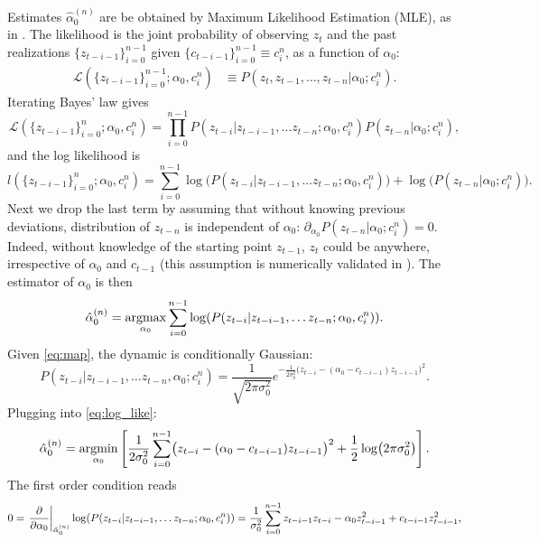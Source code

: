 \documentclass[FinalReport.tex]{subfiles}
\begin{document}
Estimates $\hat{\alpha}_0^{(n)}$ are be obtained by Maximum Likelihood Estimation (MLE), as in \cite{OptCont}. The likelihood is the joint probability of observing $z_t$ and the past realizations $\{z_{t-i-1}\}_{i=0}^{n-1}$ given $\{c_{t-i-1}\}_{i=0}^{n-1}\equiv c_i^n$, as a function of $\alpha_0$:
\begin{align}
	\mathcal{L}(\{z_{t-i-1}\}_{i=0}^{n-1};\alpha_0,c_i^n)&\equiv P(z_t,z_{t-1},\dots,z_{t-n}\vert \alpha_0;c_i^n)\label{eq:mle}.
\end{align}
Iterating Bayes' law gives
\begin{equation}
	\mathcal{L}(\{z_{t-i-1}\}_{i=0}^{n};\alpha_0,c_i^n)=\prod_{i=0}^{n-1}P(z_{t-i}\vert z_{t-i-1},\dots z_{t-n};\alpha_0,c_i^n) P(z_{t-n}\vert \alpha_0;c_i^n),
\end{equation}
and the log likelihood is
\begin{equation}\label{eq:log_lik_full}
	l(\{z_{t-i-1}\}_{i=0}^{n};\alpha_0,c_i^n)=\sum_{i=0}^{n-1}\log\bigl(P(z_{t-i}\vert z_{t-i-1},\dots z_{t-n};\alpha_0,c_i^n)\bigr) + \log\bigl(P(z_{t-n}\vert \alpha_0;c_i^n)\bigr).
\end{equation}
Next we drop the last term by assuming that without knowing previous deviations, distribution of $z_{t-n}$ is independent of $\alpha_0$: $\partial_{\alpha_0}{P(z_{t-n}\vert \alpha_0;c_i^n)}=0$. Indeed, without knowledge of the starting point $z_{t-1}$, $z_t$ could be anywhere, irrespective of $\alpha_0$ and $c_{t-1}$ (this assumption is numerically validated in \cite{OptCont}). The estimator of $\alpha_0$ is then
\begin{equation}\label{eq:log_like}
	\hat{\alpha}_0^{(n)}=\operatorname*{argmax}_{\alpha_0}\sum_{i=0}^{n-1}\log(P(z_{t-i}\vert z_{t-i-1},\dots z_{t-n};\alpha_0,c_i^n)).
\end{equation}
Given \eqref{eq:map}, the dynamic is conditionally Gaussian:
\begin{equation}
	P(z_{t-i}\vert z_{t-i-1},\dots z_{t-n},\alpha_0;c_i^n)=\frac{1}{\sqrt{2\pi\sigma_0^2}}e^{-\frac{1}{2\sigma_0^2}\bigl(z_{t-i}-(\alpha_0-c_{t-i-1})z_{t-i-1}\bigr)^2}.
\end{equation}
Plugging into \eqref{eq:log_like}:
\begin{equation}
\hat{\alpha}_0^{(n)}=\operatorname*{argmin}_{\alpha_0}\left[\frac{1}{2\sigma_0^2}\sum_{i=0}^{n-1}\bigl(z_{t-i}-(\alpha_0-c_{t-i-1})z_{t-i-1}\bigr)^2 +\frac{1}{2}\log(2\pi\sigma_0^2)\right].
\end{equation}
The first order condition reads
\begin{equation}
0=\left.\pdv{}{\alpha_0}\right\vert_{\hat{\alpha}_0^{(n)}}\log(P(z_{t-i}\vert z_{t-i-1},\dots z_{t-n};\alpha_0,c_i^n))=\frac{1}{\sigma_0^2} \sum_{i=0}^{n-1} z_{t-i-1}z_{t-i}-\alpha_0z_{t-i-1}^2+c_{t-i-1}z_{t-i-1}^2,
\end{equation}
\end{document}
